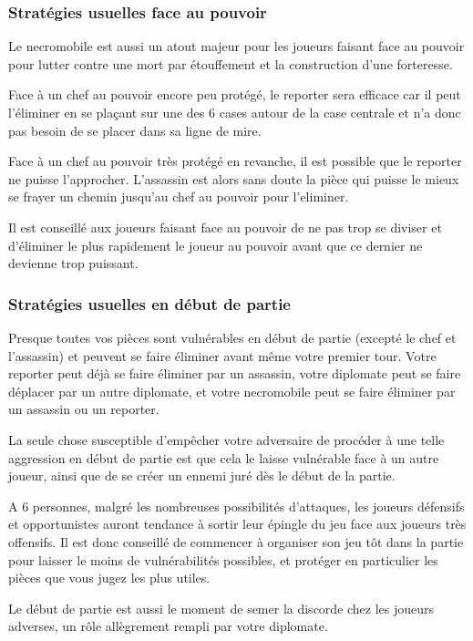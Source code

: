 \documentclass{article}
\begin{document}
\subsubsection{Stratégies usuelles face au pouvoir}

Le necromobile est aussi un atout majeur pour les joueurs faisant face au pouvoir pour lutter contre une mort par étouffement et la construction d'une forteresse.

Face à un chef au pouvoir encore peu protégé, le reporter sera efficace car il peut l'éliminer en se plaçant sur une des 6 cases autour de la case centrale et n'a donc pas besoin de se placer dans sa ligne de mire.

Face à un chef au pouvoir très protégé en revanche, il est possible que le reporter ne puisse l'approcher. 
L'assassin est alors sans doute la pièce qui puisse le mieux se frayer un chemin jusqu'au chef au pouvoir pour l'eliminer.

Il est conseillé aux joueurs faisant face au pouvoir de ne pas trop se diviser et d'éliminer le plus rapidement le joueur au pouvoir avant que ce dernier ne devienne trop puissant.

\subsubsection{Stratégies usuelles en début de partie}

Presque toutes vos pièces sont vulnérables en début de partie (excepté le chef et l'assassin) et peuvent se faire éliminer avant même votre premier tour.
Votre reporter peut déjà se faire éliminer par un assassin, votre diplomate peut se faire déplacer par un autre diplomate, et votre necromobile peut se faire éliminer par un assassin ou un reporter.

La seule chose susceptible d'empêcher votre adversaire de procéder à une telle aggression en début de partie est que cela le laisse vulnérable face à un autre joueur, ainsi que de se créer un ennemi juré dès le début de la partie.

A 6 personnes, malgré les nombreuses possibilités d'attaques, les joueurs défensifs et opportunistes auront tendance à sortir leur épingle du jeu face aux joueurs très offensifs.
Il est donc conseillé de commencer à organiser son jeu tôt dans la partie pour laisser le moins de vulnérabilités possibles, et protéger en particulier les pièces que vous jugez les plus utiles.

Le début de partie est aussi le moment de semer la discorde chez les joueurs adverses, un rôle allègrement rempli par votre diplomate.
\end{document}
